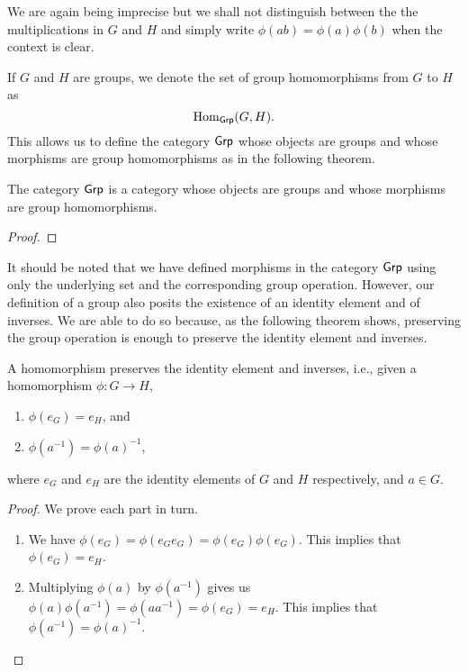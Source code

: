 \begin{remark}
    We are again being imprecise but we shall not distinguish between the the
    multiplications in \(G\) and \(H\) and simply write \(\phi(ab) =
    \phi(a)\phi(b)\) when the context is clear.
\end{remark}

\begin{definition}
    If \(G\) and \(H\) are groups, we denote the set of group homomorphisms from
    \(G\) to \(H\) as
    \[
        \operatorname{Hom}_{\mathsf{Grp}}(G, H).
    \]
    This allows us to define the category \(\mathsf{Grp}\) whose objects are groups and
    whose morphisms are group homomorphisms as in the following theorem.
\end{definition}

\begin{theorem}
    The category \(\mathsf{Grp}\) is a category whose objects are groups and whose
    morphisms are group homomorphisms.
\end{theorem}

\begin{proof}
    
\end{proof}

\begin{sectionthm}
    It should be noted that we have defined morphisms in the category \(\mathsf{Grp}\)
    using only the underlying set and the corresponding group operation.
    However, our definition of a group also posits the existence of an identity
    element and of inverses. We are able to do so because, as the following
    theorem shows, preserving the group operation is enough to preserve the
    identity element and inverses.
\end{sectionthm}

\begin{theorem}
    A homomorphism preserves the identity element and inverses, i.e., given a
    homomorphism \(\phi: G \to H\),
    \begin{enumerate}[label=(\alph*)]
        \item \(\phi(e_G) = e_H\), and
        \item \(\phi(a^{-1}) = \phi(a)^{-1}\),
    \end{enumerate}
    where \(e_G\) and \(e_H\) are the identity elements of \(G\) and \(H\)
    respectively, and \(a \in G\).
\end{theorem}

\begin{proof}
    We prove each part in turn.

    \begin{enumerate}[label=(\alph*), wide]
        \item We have \(\phi(e_G) = \phi(e_G e_G) = \phi(e_G) \phi(e_G)\). This
        implies that \(\phi(e_G) = e_H\).
        \item Multiplying \(\phi(a)\) by \(\phi(a^{-1})\) gives us
        \(\phi(a)\phi(a^{-1}) = \phi(aa^{-1}) = \phi(e_G) = e_H\). This implies
        that \(\phi(a^{-1}) = \phi(a)^{-1}\).
    \end{enumerate}
\end{proof}

